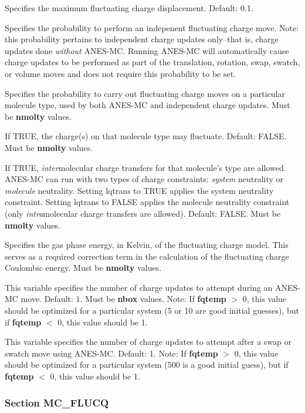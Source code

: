 \documentclass[12pt,letterpaper]{article}
\begin{document}
 Specifies the maximum fluctuating
charge displacement. Default: 0.1.

 Specifies the probability to perform
an indepenent fluctuating charge move. Note: this probability pertains to
independent charge updates only--that is, charge updates done
{\sl without} ANES-MC. Running ANES-MC will automatically 
cause charge updates to be performed as part of the translation, 
rotation, swap, swatch, or volume moves and
does not require this probability to be set.

 Specifies the probability to
carry out fluctuating charge moves on a particular molecule type,
used by both ANES-MC and independent charge updates. 
Must be {\bf nmolty} values.

 If TRUE, the charge(s) on that
molecule type may fluctuate. Default: FALSE. 
Must be {\bf nmolty} values.

 If TRUE, {\sl inter}molecular charge
transfers for that molecule's type are allowed. ANES-MC can run with
two types of charge constraints: {\sl system} neutrality or {\sl molecule} neutrality.
Setting lqtrans to TRUE applies the system neutrality constraint. Setting
lqtrans to FALSE applies the molecule neutrality constraint (only 
{\sl intra}molecular charge transfers are allowed).
Default: FALSE.  Must be {\bf nmolty} values.

 Specifies the gas phase energy, in Kelvin, of the
fluctuating charge model. This serves as a required correction term in the
calculation of the fluctuating charge Coulombic energy. 
Must be {\bf nmolty} values.

 This variable specifies the number of
charge updates to attempt during an ANES-MC move. Default: 1. 
Must be {\bf nbox} values. 
Note: 
If {\bf fqtemp} $>$ 0, this value should be optimized for a particular system
(5 or 10 are good initial guesses), but if {\bf fqtemp} $<$ 0, this value 
should be 1.

 This variable specifies the number of
charge updates to attempt after a swap or swatch move using ANES-MC. 
Default: 1. Note: 
If {\bf fqtemp} $>$ 0, this value should be optimized for a particular system
(500 is a good initial guess), but if {\bf fqtemp} $<$ 0, this value 
should be 1.

\subsubsection{Section \textbf{MC\_FLUCQ}}
\end{document}
